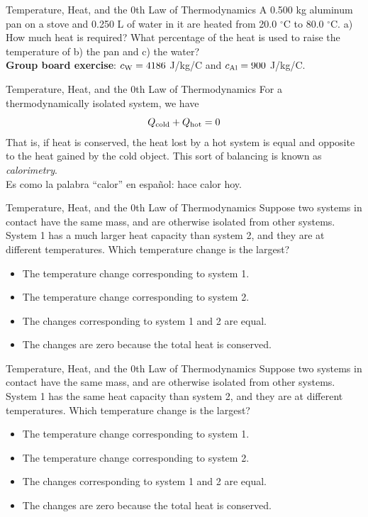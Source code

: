 \documentclass{beamer}
\begin{document}
\begin{frame}{Temperature, Heat, and the 0th Law of Thermodynamics}
A 0.500 kg aluminum pan on a stove and 0.250 L of water in it are heated from 20.0 $^\circ$C to 80.0 $^\circ$C. a) How much heat is required? What percentage of the heat is used to raise the temperature of b) the pan and c) the water? \\ \vspace{0.5cm}
\textbf{Group board exercise}: $c_{\rm W} = 4186$ J/kg/C and $c_{\rm Al} = 900$ J/kg/C.
\end{frame}

\begin{frame}{Temperature, Heat, and the 0th Law of Thermodynamics}
For a thermodynamically isolated system, we have
\begin{equation}
Q_{\rm cold} + Q_{\rm hot} = 0
\label{eq:calor}
\end{equation}
That is, if heat is conserved, the heat lost by a hot system is equal and opposite to the heat gained by the cold object. This sort of balancing is known as \textit{calorimetry}.  \\ \vspace{0.5cm}
Es como la palabra ``calor'' en espa\~{n}ol: hace calor hoy.
\end{frame}

\begin{frame}{Temperature, Heat, and the 0th Law of Thermodynamics}
\small
Suppose two systems in contact have the same mass, and are otherwise isolated from other systems.  System 1 has a much larger heat capacity than system 2, and they are at different temperatures.  Which temperature change is the largest?
\begin{itemize}
\item The temperature change corresponding to system 1.
\item The temperature change corresponding to system 2.
\item The changes corresponding to system 1 and 2 are equal.
\item The changes are zero because the total heat is conserved.
\end{itemize}
\end{frame}

\begin{frame}{Temperature, Heat, and the 0th Law of Thermodynamics}
\small
Suppose two systems in contact have the same mass, and are otherwise isolated from other systems.  System 1 has the same heat capacity than system 2, and they are at different temperatures.  Which temperature change is the largest?
\begin{itemize}
\item The temperature change corresponding to system 1.
\item The temperature change corresponding to system 2.
\item The changes corresponding to system 1 and 2 are equal.
\item The changes are zero because the total heat is conserved.
\end{itemize}
\end{frame}
\end{document}
